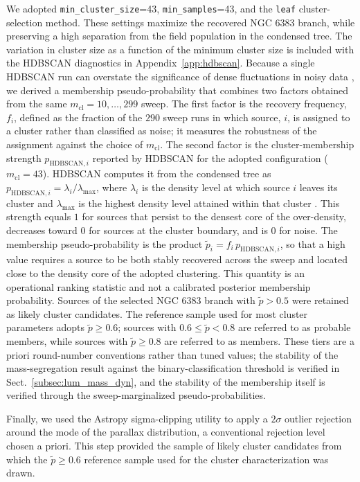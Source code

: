 \documentclass{aa}
\begin{document}
We adopted \texttt{min\_cluster\_size}=43, \texttt{min\_samples}=43, and the \texttt{leaf} cluster-selection method. These settings maximize the recovered NGC 6383 branch, while preserving a high separation from the field population in the condensed tree. The variation in cluster size as a function of the minimum cluster size is included with the HDBSCAN diagnostics in Appendix~\ref{app:hdbscan}. Because a single HDBSCAN run can overstate the significance of dense fluctuations in noisy data \citep{2021A&A...646A.104H}, we derived a membership pseudo-probability that combines two factors obtained from the same $m_{\mathrm{cl}}=10,\ldots,299$ sweep. The first factor is the recovery frequency, $f_i$, defined as the fraction of the $290$ sweep runs in which source, $i$, is assigned to a cluster rather than classified as noise; it measures the robustness of the assignment against the choice of $m_{\mathrm{cl}}$. The second factor is the cluster-membership strength $p_{\mathrm{HDBSCAN},i}$ reported by HDBSCAN for the adopted configuration ($m_{\mathrm{cl}}=43$). HDBSCAN computes it from the condensed tree as $p_{\mathrm{HDBSCAN},i}=\lambda_i/\lambda_{\mathrm{max}}$, where $\lambda_i$ is the density level at which source $i$ leaves its cluster and $\lambda_{\mathrm{max}}$ is the highest density level attained within that cluster \citep{McInnes2017}. This strength equals $1$ for sources that persist to the densest core of the over-density, decreases toward $0$ for sources at the cluster boundary, and is $0$ for noise. The membership pseudo-probability is the product $\tilde{p}_i=f_i\,p_{\mathrm{HDBSCAN},i}$, so that a high value requires a source to be both stably recovered across the sweep and located close to the density core of the adopted clustering. This quantity is an operational ranking statistic and not a calibrated posterior membership probability. Sources of the selected NGC 6383 branch with $\tilde{p}>0.5$ were retained as likely cluster candidates. The reference sample used for most cluster parameters adopts $\tilde{p}\geq0.6$; sources with $0.6\leq\tilde{p}<0.8$ are referred to as probable members, while sources with $\tilde{p}\geq0.8$ are referred to as members. These tiers are a priori round-number conventions rather than tuned values; the stability of the mass-segregation result against the binary-classification threshold is verified in Sect.~\ref{subsec:lum_mass_dyn}, and the stability of the membership itself is verified through the sweep-marginalized pseudo-probabilities.

Finally, we used the Astropy sigma-clipping \citep{astropy:2013,astropy:2018,astropy:2022} utility to apply a $2\sigma$ outlier rejection around the mode of the parallax distribution, a conventional rejection level chosen a priori. This step provided the sample of likely cluster candidates from which the $\tilde{p}\geq0.6$ reference sample used for the cluster characterization was drawn.
\end{document}
